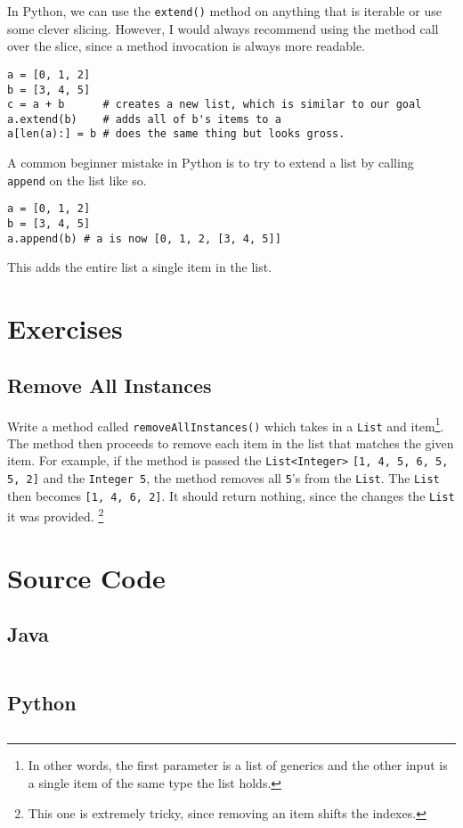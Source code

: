 In Python, we can use the \texttt{extend()} method on anything that is iterable or use some clever slicing.  However, I would always recommend using the method call over the slice, since a method invocation is always more readable.


\begin{verbatim}
a = [0, 1, 2]
b = [3, 4, 5]
c = a + b      # creates a new list, which is similar to our goal
a.extend(b)    # adds all of b's items to a
a[len(a):] = b # does the same thing but looks gross.
\end{verbatim}
A common beginner mistake in Python is to try to extend a list by calling \texttt{append} on the list like so.

\begin{verbatim}
a = [0, 1, 2]
b = [3, 4, 5]
a.append(b) # a is now [0, 1, 2, [3, 4, 5]]
\end{verbatim}



This adds the entire list a single item in the list.  

\newpage

\section{Exercises}


\subsection{Remove All Instances}
\label{ex-remove-all}
Write a method called \texttt{removeAllInstances()} which takes in a \texttt{List} and item\footnote{In other words, the first parameter is a list of generics and the other input is a single item of the same type the list holds.}.
The method then proceeds to remove each item in the list that matches the given item.
For example, if the method is passed the \texttt{List<Integer>} \texttt{[1, 4, 5, 6, 5, 5, 2]} and the \texttt{Integer }\texttt{5}, the method removes all \texttt{5}'s from the \texttt{List}.
The \texttt{List} then becomes \texttt{[1, 4, 6, 2]}.
It should return nothing, since the changes the \texttt{List} it was provided.
\footnote{This one is extremely tricky, since removing an item shifts the indexes.}
\newpage
\section{Source Code}
\subsection{Java}
\inputminted{Java}{code/MyArrayList.java}
\newpage
\subsection{Python}
\inputminted{Python3}{code/arraylist.py}